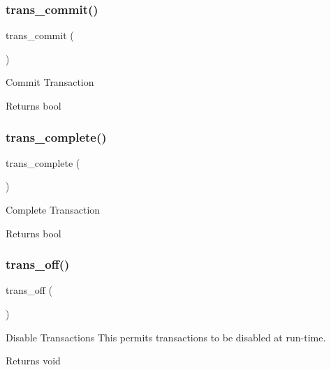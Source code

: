 \subsubsection{\texorpdfstring{trans\+\_\+commit()}{trans\_commit()}}
{\footnotesize\ttfamily trans\+\_\+commit (\begin{DoxyParamCaption}{ }\end{DoxyParamCaption})}

Commit Transaction

\begin{DoxyReturn}{Returns}
bool 
\end{DoxyReturn}
\mbox{\label{class_c_i___d_b__driver_aa0edd209de428801ce5faa1fe740852e}} 
\subsubsection{\texorpdfstring{trans\+\_\+complete()}{trans\_complete()}}
{\footnotesize\ttfamily trans\+\_\+complete (\begin{DoxyParamCaption}{ }\end{DoxyParamCaption})}

Complete Transaction

\begin{DoxyReturn}{Returns}
bool 
\end{DoxyReturn}
\mbox{\label{class_c_i___d_b__driver_ae9080ca6b0a9a258f5e87750b266e337}} 
\subsubsection{\texorpdfstring{trans\+\_\+off()}{trans\_off()}}
{\footnotesize\ttfamily trans\+\_\+off (\begin{DoxyParamCaption}{ }\end{DoxyParamCaption})}

Disable Transactions This permits transactions to be disabled at run-\/time.

\begin{DoxyReturn}{Returns}
void 
\end{DoxyReturn}
\mbox{\label{class_c_i___d_b__driver_a53f76d4dfcd6ac04fb653982442aeef8}} 
